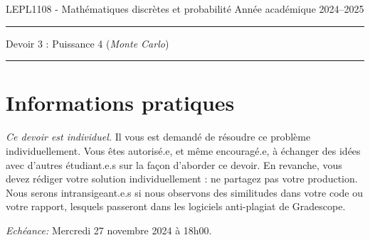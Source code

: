 \documentclass[11pt,answers]{exam}
\begin{document}
\noindent
LEPL1108 - Mathématiques discrètes et probabilité \hfill Année académique 2024--2025\\[-2mm]
\rule{\linewidth}{0.5pt}

\begin{center}

{\large Devoir 3 : Puissance 4 (\textit{Monte Carlo})}
\bigskip

\end{center}
\hrule
\bigskip

\section*{Informations pratiques}
\noindent

\noindent
\emph{Ce devoir est individuel.}
Il vous est demandé de résoudre ce problème individuellement. Vous êtes autorisé.e, et même encouragé.e, à échanger des idées avec d'autres étudiant.e.s sur la façon d'aborder ce devoir. En revanche, vous devez rédiger votre solution individuellement : ne partagez pas votre production. Nous serons intransigeant.e.s si nous observons des similitudes dans votre code ou votre rapport, lesquels passeront dans les logiciels anti-plagiat de Gradescope.  

\bigskip \noindent
\emph{Echéance:} Mercredi 27 novembre 2024 à 18h00.

\bigskip


\noindent
\end{document}
